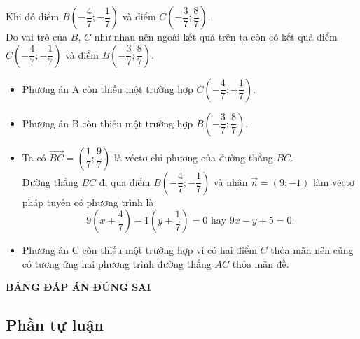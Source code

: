 \begin{ex}
{		Khi đó điểm $B\left(-\dfrac{4}{7};-\dfrac{1}{7}\right)$ và điểm $C\left(-\dfrac{3}{7};\dfrac{8}{7}\right)$. \\
		Do vai trò của $B$, $C$ như nhau nên ngoài kết quả trên ta còn có kết quả điểm $C\left(-\dfrac{4}{7};-\dfrac{1}{7}\right)$ và điểm $B\left(-\dfrac{3}{7};\dfrac{8}{7}\right)$.  
		\begin{itemize}
			\item Phương án A còn thiếu một trường hợp $C\left(-\dfrac{4}{7};-\dfrac{1}{7}\right)$.
			\item Phương án B còn thiếu một trường hợp $B\left(-\dfrac{3}{7};\dfrac{8}{7}\right)$.
			\item Ta có $\overrightarrow{BC}=\left(\dfrac{1}{7};\dfrac{9}{7}\right)$ là véctơ chỉ phương của đường thẳng $BC$.\\
			Đường thẳng $BC$ đi qua điểm $B\left(-\dfrac{4}{7};-\dfrac{1}{7}\right)$ và nhận $\overrightarrow{n}=(9;-1)$ làm véctơ pháp tuyến có phương trình là
			$$9\left(x+\dfrac{4}{7}\right)-1\left(y+\dfrac{1}{7}\right)=0 \text{ hay } 9x-y+5=0.$$
			\item Phương án C còn thiếu một trường hợp vì có hai điểm $C$ thỏa mãn nên cũng có tương ứng hai phương trình đường thẳng $AC$ thỏa mãn đề.
		\end{itemize}
	}
\end{ex}



\begin{center}
	\textbf{\textsf{BẢNG ĐÁP ÁN ĐÚNG SAI}}
\end{center}

\subsection{Phần tự luận}

